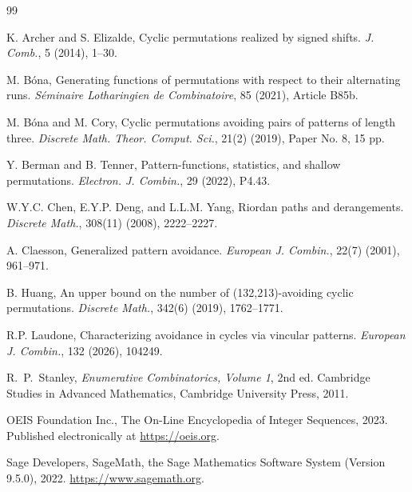 \documentclass[11pt]{article}
\theoremstyle{definition}
\begin{document}

\begin{thebibliography}{99}

 K. Archer and S. Elizalde, Cyclic permutations realized by signed shifts. \textit{J. Comb.}, 5 (2014), 1--30.

 M. B\'{o}na, Generating functions of permutations with respect to their alternating runs. \textit{S\'eminaire Lotharingien de Combinatoire}, 85 (2021), Article B85b.

 M. B\'{o}na and M. Cory, Cyclic permutations avoiding pairs of patterns of length three. \textit{Discrete Math. Theor. Comput. Sci.}, 21(2) (2019), Paper No. 8, 15 pp.

 Y. Berman and B. Tenner, Pattern-functions, statistics, and shallow permutations. \textit{Electron. J. Combin.}, 29 (2022), P4.43.

 W.Y.C. Chen, E.Y.P. Deng, and L.L.M. Yang, Riordan paths and derangements. \textit{Discrete Math.}, 308(11) (2008), 2222--2227.

 A. Claesson, Generalized pattern avoidance. \textit{European J. Combin.}, 22(7) (2001), 961--971.

 B. Huang, An upper bound on the number of (132,213)-avoiding cyclic permutations. \textit{Discrete Math.}, 342(6) (2019), 1762--1771.

 R.P. Laudone, Characterizing avoidance in cycles via vincular patterns. \textit{European J. Combin.}, 132 (2026), 104249.

 R.~P.~Stanley, \textit{Enumerative Combinatorics, Volume 1}, 2nd ed. Cambridge Studies in Advanced Mathematics, Cambridge University Press, 2011.

 OEIS Foundation Inc., The On-Line Encyclopedia of Integer Sequences, 2023. Published electronically at \url{https://oeis.org}.

 Sage Developers, SageMath, the Sage Mathematics Software System (Version 9.5.0), 2022. \url{https://www.sagemath.org}.

\end{thebibliography}

\end{document}
